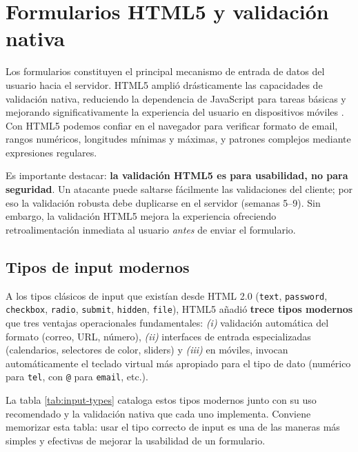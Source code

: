 \documentclass[11pt,a4paper,openany]{book}
\begin{document}
\section{Formularios HTML5 y validación nativa}

Los formularios constituyen el principal mecanismo de entrada de
datos del usuario hacia el servidor. HTML5 amplió drásticamente las
capacidades de validación nativa, reduciendo la dependencia de
JavaScript para tareas básicas y mejorando significativamente la
experiencia del usuario en dispositivos móviles
\cite{nixon2021learning}. Con HTML5 podemos confiar en el navegador
para verificar formato de email, rangos numéricos, longitudes
mínimas y máximas, y patrones complejos mediante expresiones
regulares.

Es importante destacar: \textbf{la validación HTML5 es para
usabilidad, no para seguridad}. Un atacante puede saltarse fácilmente
las validaciones del cliente; por eso la validación robusta debe
duplicarse en el servidor (semanas 5--9). Sin embargo, la
validación HTML5 mejora la experiencia ofreciendo retroalimentación
inmediata al usuario \emph{antes} de enviar el formulario.

\subsection{Tipos de input modernos}

A los tipos clásicos de input que existían desde HTML 2.0
(\texttt{text}, \texttt{password}, \texttt{checkbox}, \texttt{radio},
\texttt{submit}, \texttt{hidden}, \texttt{file}), HTML5 añadió
\textbf{trece tipos modernos} que tres ventajas operacionales
fundamentales: \emph{(i)} validación automática del formato (correo,
URL, número), \emph{(ii)} interfaces de entrada especializadas
(calendarios, selectores de color, sliders) y \emph{(iii)} en
móviles, invocan automáticamente el teclado virtual más apropiado
para el tipo de dato (numérico para \texttt{tel}, con \texttt{@}
para \texttt{email}, etc.).

La tabla \ref{tab:input-types} cataloga estos tipos modernos junto
con su uso recomendado y la validación nativa que cada uno
implementa. Conviene memorizar esta tabla: usar el tipo correcto de
input es una de las maneras más simples y efectivas de mejorar la
usabilidad de un formulario.
\end{document}
